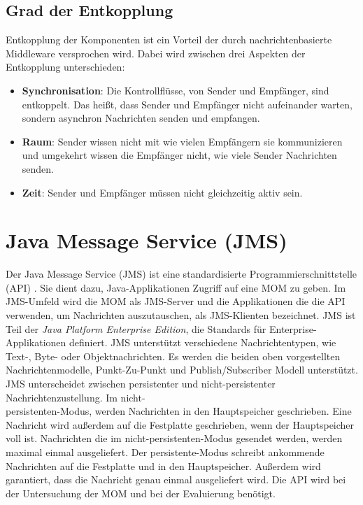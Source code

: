 \subsection{Grad der Entkopplung}
Entkopplung der Komponenten ist ein Vorteil der durch nachrichtenbasierte Middleware versprochen wird. Dabei wird zwischen drei Aspekten der Entkopplung \cite{Eugster03} unterschieden:
\begin{itemize}
    \item \textbf{Synchronisation}: Die Kontrollflüsse, von Sender und Empfänger, sind entkoppelt. Das heißt, dass Sender und Empfänger nicht aufeinander warten, sondern asynchron Nachrichten senden und empfangen.
    \item \textbf{Raum}: Sender wissen nicht mit wie vielen Empfängern sie kommunizieren und umgekehrt wissen die Empfänger nicht, wie viele Sender Nachrichten senden.
    \item \textbf{Zeit}: Sender und Empfänger müssen nicht gleichzeitig aktiv sein.
\end{itemize}

\section{Java Message Service (JMS)}
Der Java Message Service (JMS) ist eine standardisierte Programmierschnittstelle (API) \cite{jmsspec}. Sie dient dazu, Java-Applikationen Zugriff auf eine MOM zu geben. Im JMS-Umfeld wird die MOM als JMS-Server und die Applikationen die die API verwenden, um Nachrichten auszutauschen, als JMS-Klienten bezeichnet. JMS ist Teil der \emph{Java Platform Enterprise Edition}, die Standards für Enterprise-Applikationen definiert. JMS unterstützt verschiedene Nachrichtentypen, wie Text-, Byte- oder Objektnachrichten. Es werden die beiden oben vorgestellten Nachrichtenmodelle, Punkt-Zu-Punkt und Publish/Subscriber Modell unterstützt. JMS unterscheidet zwischen persistenter und nicht-persistenter Nachrichtenzustellung. Im nicht-\\persistenten-Modus, werden Nachrichten in den Hauptspeicher geschrieben. Eine Nachricht wird außerdem auf die Festplatte geschrieben, wenn der Hauptspeicher voll ist. Nachrichten die im nicht-persistenten-Modus gesendet werden, werden maximal einmal ausgeliefert. Der persistente-Modus schreibt ankommende Nachrichten auf die Festplatte und in den Hauptspeicher. Außerdem wird garantiert, dass die Nachricht genau einmal ausgeliefert wird. 
Die API wird bei der Untersuchung der MOM und bei der Evaluierung benötigt.

